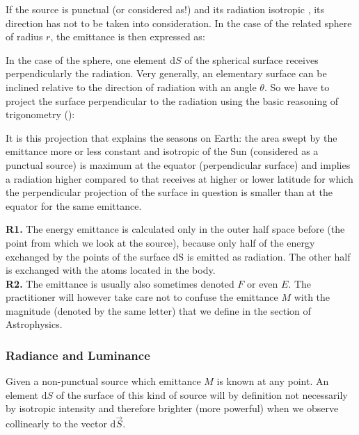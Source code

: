 	If the source is punctual (or considered as!) and its radiation isotropic , its direction has not to be taken into consideration. In the case of the related sphere of radius $r$, the emittance is then expressed as:
	
	In the case of the sphere, one element $\mathrm{d}S$ of the spherical surface receives perpendicularly the radiation. Very generally, an elementary surface can be inclined relative to the direction of radiation with an angle $\theta$.\label{surface projection emittence} So we have to project the surface perpendicular to the radiation using the basic reasoning of trigonometry ():
	
	It is this projection that explains the seasons on Earth: the area swept by the emittance more or less constant and isotropic of the Sun (considered as a punctual source) is maximum at the equator (perpendicular surface) and implies a radiation higher compared to that receives at higher or lower latitude for which the perpendicular projection of the surface in question is smaller than at the equator for the same emittance.
	
	\begin{tcolorbox}[title=Remarks,colframe=black,arc=10pt]
	\textbf{R1.} The energy emittance is calculated only in the outer half space before (the point from which we look at the source), because only half of the energy exchanged by the points of the surface $\mathrm{d}$S is emitted as radiation. The other half is exchanged with the atoms located in the body.\\
	
	\textbf{R2.} The emittance is usually also sometimes denoted $F$ or even $E$. The practitioner will however take care not to confuse the emittance $M$ with the magnitude (denoted by the same letter) that we define in the section of Astrophysics.
	\end{tcolorbox}
	
	\subsubsection{Radiance and Luminance}\label{radiance and luminance}
	Given a non-punctual source which emittance $M$ is known at any point. An element $\mathrm{d}S$ of the surface of this kind of source will by definition not necessarily by isotropic intensity and therefore brighter (more powerful) when we observe collinearly to the vector $\mathrm{d}\vec{S}$.
	
